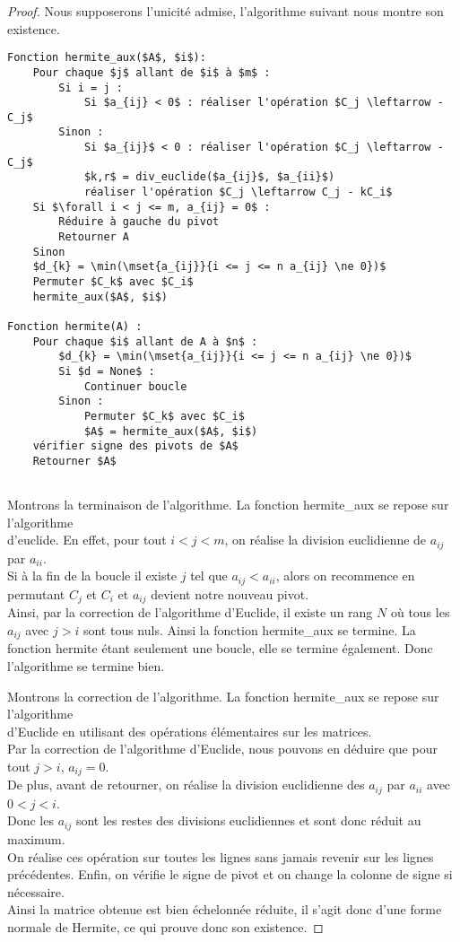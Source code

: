 \documentclass[11pt]{article}
\begin{document}
\begin{proof}
	Nous supposerons l'unicité admise, l'algorithme suivant nous montre son existence.
	\begin{lstlisting}
Fonction hermite_aux($A$, $i$):
	Pour chaque $j$ allant de $i$ à $m$ :
		Si i = j :
			Si $a_{ij} < 0$ : réaliser l'opération $C_j \leftarrow -C_j$
		Sinon :
			Si $a_{ij}$ < 0 : réaliser l'opération $C_j \leftarrow -C_j$
			$k,r$ = div_euclide($a_{ij}$, $a_{ii}$)
			réaliser l'opération $C_j \leftarrow C_j - kC_i$
	Si $\forall i < j <= m, a_{ij} = 0$ :
		Réduire à gauche du pivot
		Retourner A
	Sinon
	$d_{k} = \min(\mset{a_{ij}}{i <= j <= n a_{ij} \ne 0})$
	Permuter $C_k$ avec $C_i$
	hermite_aux($A$, $i$)

Fonction hermite(A) :
	Pour chaque $i$ allant de A à $n$ :
		$d_{k} = \min(\mset{a_{ij}}{i <= j <= n a_{ij} \ne 0})$
		Si $d = None$ :
			Continuer boucle
		Sinon :
			Permuter $C_k$ avec $C_i$
			$A$ = hermite_aux($A$, $i$)
	vérifier signe des pivots de $A$
	Retourner $A$


\end{lstlisting}

	Montrons la terminaison de l'algorithme.
	La fonction hermite\_aux se repose sur l'algorithme \\d'euclide. En effet, pour tout $i < j < m$, on réalise la
	division euclidienne de $a_{ij}$ par $a_{ii}$.\\
	Si à la fin de la boucle il existe $j$ tel que
	$a_{ij} < a_{ii}$, alors on recommence en permutant $C_j$ et $C_i$ et $a_{ij}$ devient notre nouveau pivot.\\
	Ainsi, par la correction de l'algorithme d'Euclide, il existe un rang $N$ où tous les $a_{ij}$ avec $j> i$ sont tous nuls.
	Ainsi la fonction hermite\_aux se termine. La fonction hermite étant seulement une boucle, elle se termine également.
	Donc l'algorithme se termine bien.

	Montrons la correction de l'algorithme.	La fonction hermite\_aux se repose sur l'algorithme\\
	d'Euclide en utilisant des opérations élémentaires sur les matrices.\\
	Par la correction de l'algorithme d'Euclide, nous pouvons en déduire que	pour tout $j > i$, $a_{ij} = 0$.\\
	De plus, avant de retourner, on réalise la division euclidienne des $a_{ij}$ par $a_{ii}$ avec $0 < j < i$.\\
	Donc les $a_{ij}$ sont les restes des divisions euclidiennes et sont donc réduit au maximum.\\
	On réalise ces opération sur toutes les lignes sans jamais revenir sur les lignes précédentes.
	Enfin, on vérifie le signe de pivot et on change la colonne de signe si nécessaire.\\
	Ainsi la matrice obtenue est bien échelonnée réduite,
	il s'agit donc d'une forme normale de Hermite, ce qui prouve donc son existence.

\end{proof}
\end{document}
